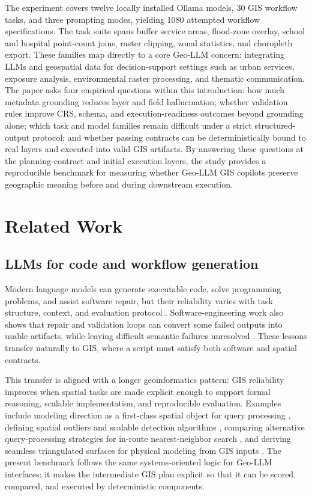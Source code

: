 \documentclass[12pt]{gsis}  %
\begin{document}
The experiment covers twelve locally installed Ollama models, 30 GIS workflow tasks, and three prompting modes, yielding 1080 attempted workflow specifications. The task suite spans buffer service areas, flood-zone overlay, school and hospital point-count joins, raster clipping, zonal statistics, and choropleth export. These families map directly to a core Geo-LLM concern: integrating LLMs and geospatial data for decision-support settings such as urban services, exposure analysis, environmental raster processing, and thematic communication. The paper asks four empirical questions within this introduction: how much metadata grounding reduces layer and field hallucination; whether validation rules improve CRS, schema, and execution-readiness outcomes beyond grounding alone; which task and model families remain difficult under a strict structured-output protocol; and whether passing contracts can be deterministically bound to real layers and executed into valid GIS artifacts. By answering these questions at the planning-contract and initial execution layers, the study provides a reproducible benchmark for measuring whether Geo-LLM GIS copilots preserve geographic meaning before and during downstream execution.

\section{Related Work}

\subsection{LLMs for code and workflow generation}

Modern language models can generate executable code, solve programming problems, and assist software repair, but their reliability varies with task structure, context, and evaluation protocol \citep{Li_2022,Xu_2022,Du_2024,Ni_2024,Jiang_2026}. Software-engineering work also shows that repair and validation loops can convert some failed outputs into usable artifacts, while leaving difficult semantic failures unresolved \citep{Gazzola_2019,Monperrus_2018,Le_Goues_2012}. These lessons transfer naturally to GIS, where a script must satisfy both software and spatial contracts.

This transfer is aligned with a longer geoinformatics pattern: GIS reliability improves when spatial tasks are made explicit enough to support formal reasoning, scalable implementation, and reproducible evaluation. Examples include modeling direction as a first-class spatial object for query processing \citep{Shekhar_1999_ObjectDirection}, defining spatial outliers and scalable detection algorithms \citep{Shekhar_2003_SpatialOutliers}, comparing alternative query-processing strategies for in-route nearest-neighbor search \citep{Yoo_2005_InRouteNN}, and deriving seamless triangulated surfaces for physical modeling from GIS inputs \citep{Camelli_2012_SeamlessSurfaces}. The present benchmark follows the same systems-oriented logic for Geo-LLM interfaces: it makes the intermediate GIS plan explicit so that it can be scored, compared, and executed by deterministic components.
\end{document}
